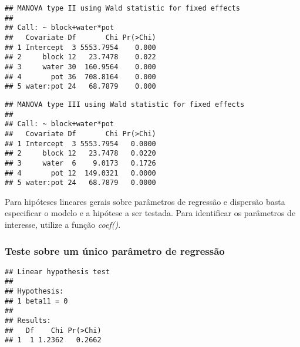 
\begin{knitrout}
\color{fgcolor}\begin{kframe}
\begin{alltt}
\end{alltt}
\begin{verbatim}
## MANOVA type II using Wald statistic for fixed effects
## 
## Call: ~ block+water*pot
##   Covariate Df       Chi Pr(>Chi)
## 1 Intercept  3 5553.7954    0.000
## 2     block 12   23.7478    0.022
## 3     water 30  160.9564    0.000
## 4       pot 36  708.8164    0.000
## 5 water:pot 24   68.7879    0.000
\end{verbatim}
\end{kframe}
\end{knitrout}


\begin{knitrout}
\color{fgcolor}\begin{kframe}
\begin{alltt}
\end{alltt}
\begin{verbatim}
## MANOVA type III using Wald statistic for fixed effects
## 
## Call: ~ block+water*pot
##   Covariate Df       Chi Pr(>Chi)
## 1 Intercept  3 5553.7954   0.0000
## 2     block 12   23.7478   0.0220
## 3     water  6    9.0173   0.1726
## 4       pot 12  149.0321   0.0000
## 5 water:pot 24   68.7879   0.0000
\end{verbatim}
\end{kframe}
\end{knitrout}

Para hipóteses lineares gerais sobre parâmetros de regressão e dispersão basta especificar o modelo e a hipótese a ser testada. Para identificar os parâmetros de interesse, utilize a função \emph{coef()}.

\subsubsection{Teste sobre um único parâmetro de regressão}

\begin{knitrout}
\color{fgcolor}\begin{kframe}
\begin{alltt}
\hlstd{(} 
                      \hlstd{=} \hlstd{(}\hlstd{))}
\end{alltt}
\begin{verbatim}
## Linear hypothesis test
## 
## Hypothesis:            
## 1 beta11 = 0
## 
## Results:
##   Df    Chi Pr(>Chi)
## 1  1 1.2362   0.2662
\end{verbatim}
\end{kframe}
\end{knitrout}

